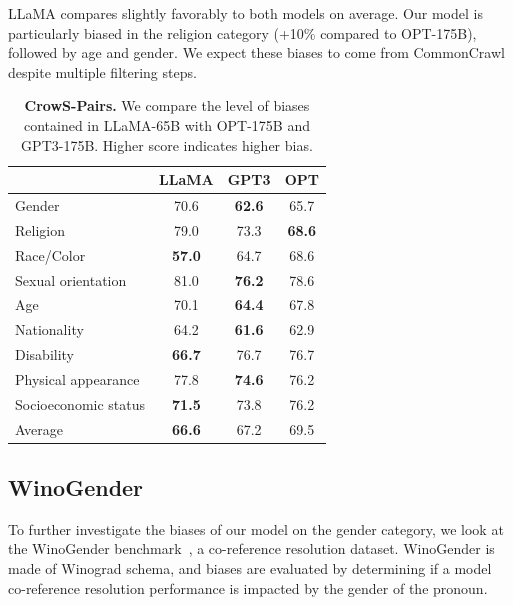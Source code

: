 \documentclass[11pt]{article}
\newcommand{\model}{LLaMA\xspace}
\begin{document}
\model compares slightly favorably to both models on average.
Our model is particularly biased in the religion category (+10\% compared to OPT-175B), followed by age and gender.
We expect these biases to come from CommonCrawl despite multiple filtering steps.

\begin{table}[t]
  \center
  \setlength{\tabcolsep}{7pt}
  \begin{tabular}{@{}lccc@{}}
  \toprule
  & \model & GPT3 & OPT \\
  \midrule
  Gender & 70.6 & \textbf{62.6} & 65.7 \\
  Religion & 79.0 & 73.3 & \textbf{68.6} \\ 
  Race/Color & \textbf{57.0} & 64.7 & 68.6 \\
  Sexual orientation & 81.0 & \textbf{76.2} & 78.6 \\
  Age & 70.1 & \textbf{64.4} & 67.8 \\
  Nationality & 64.2 & \textbf{61.6} & 62.9 \\
  Disability & \textbf{66.7} & 76.7 & 76.7 \\
  Physical appearance & 77.8 & \textbf{74.6} & 76.2 \\
  Socioeconomic status & \textbf{71.5} & 73.8 & 76.2 \\ \midrule
  Average & \textbf{66.6} & 67.2 & 69.5 \\
  \bottomrule
  \end{tabular}
  \caption{
  \textbf{CrowS-Pairs.} 
  We compare the level of biases contained in \model-65B with OPT-175B and GPT3-175B. Higher score indicates higher bias.
  }
  \vspace{1em}
  \label{tab:crows}
\end{table}

\subsection{WinoGender}

To further investigate the biases of our model on the gender category, we look at the WinoGender benchmark~\citep{rudinger2018gender}, a co-reference resolution dataset. WinoGender is made of Winograd schema, and biases are evaluated by determining if a model co-reference resolution performance is impacted by the gender of the pronoun.
\end{document}

